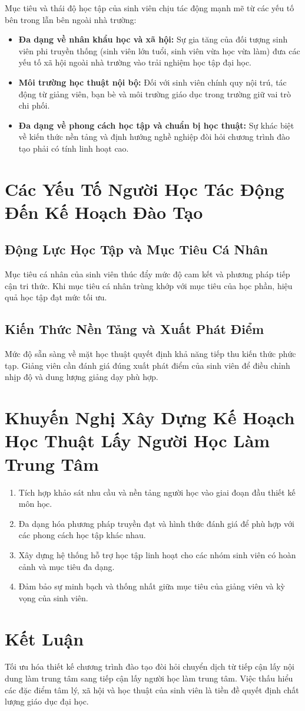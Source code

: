 \documentclass[12pt,a4paper]{article}
\begin{document}
Mục tiêu và thái độ học tập của sinh viên chịu tác động mạnh mẽ từ các yếu tố bên trong lẫn bên ngoài nhà trường:
\begin{itemize}
    \item \textbf{Đa dạng về nhân khẩu học và xã hội:} Sự gia tăng của đối tượng sinh viên phi truyền thống (sinh viên lớn tuổi, sinh viên vừa học vừa làm) đưa các yếu tố xã hội ngoài nhà trường vào trải nghiệm học tập đại học.
    \item \textbf{Môi trường học thuật nội bộ:} Đối với sinh viên chính quy nội trú, tác động từ giảng viên, bạn bè và môi trường giáo dục trong trường giữ vai trò chi phối.
    \item \textbf{Đa dạng về phong cách học tập và chuẩn bị học thuật:} Sự khác biệt về kiến thức nền tảng và định hướng nghề nghiệp đòi hỏi chương trình đào tạo phải có tính linh hoạt cao.
\end{itemize}

\section{Các Yếu Tố Người Học Tác Động Đến Kế Hoạch Đào Tạo}

\subsection{Động Lực Học Tập và Mục Tiêu Cá Nhân}
Mục tiêu cá nhân của sinh viên thúc đẩy mức độ cam kết và phương pháp tiếp cận tri thức. Khi mục tiêu cá nhân trùng khớp với mục tiêu của học phần, hiệu quả học tập đạt mức tối ưu.

\subsection{Kiến Thức Nền Tảng và Xuất Phát Điểm}
Mức độ sẵn sàng về mặt học thuật quyết định khả năng tiếp thu kiến thức phức tạp. Giảng viên cần đánh giá đúng xuất phát điểm của sinh viên để điều chỉnh nhịp độ và dung lượng giảng dạy phù hợp.

\section{Khuyến Nghị Xây Dựng Kế Hoạch Học Thuật Lấy Người Học Làm Trung Tâm}

\begin{enumerate}
    \item Tích hợp khảo sát nhu cầu và nền tảng người học vào giai đoạn đầu thiết kế môn học.
    \item Đa dạng hóa phương pháp truyền đạt và hình thức đánh giá để phù hợp với các phong cách học tập khác nhau.
    \item Xây dựng hệ thống hỗ trợ học tập linh hoạt cho các nhóm sinh viên có hoàn cảnh và mục tiêu đa dạng.
    \item Đảm bảo sự minh bạch và thống nhất giữa mục tiêu của giảng viên và kỳ vọng của sinh viên.
\end{enumerate}

\section{Kết Luận}

Tối ưu hóa thiết kế chương trình đào tạo đòi hỏi chuyển dịch từ tiếp cận lấy nội dung làm trung tâm sang tiếp cận lấy người học làm trung tâm. Việc thấu hiểu các đặc điểm tâm lý, xã hội và học thuật của sinh viên là tiền đề quyết định chất lượng giáo dục đại học.
\end{document}
